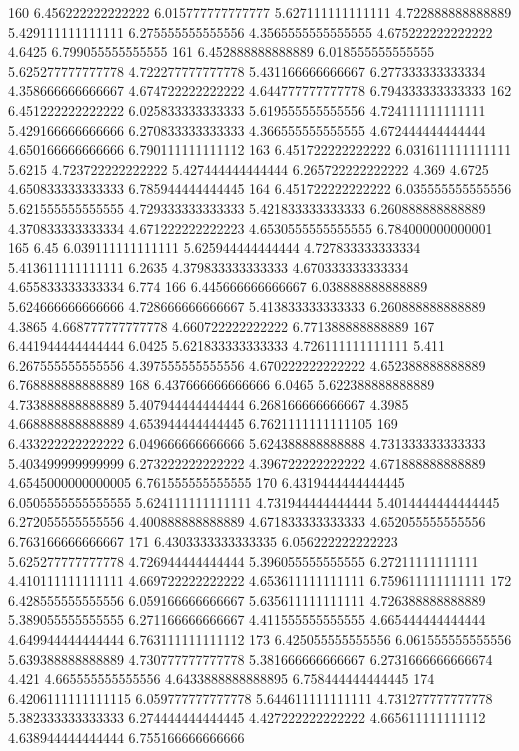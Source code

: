160 6.456222222222222 6.015777777777777 5.627111111111111 4.722888888888889 5.429111111111111 6.275555555555556 4.3565555555555555 4.675222222222222 4.6425 6.799055555555555
161 6.452888888888889 6.018555555555555 5.625277777777778 4.722277777777778 5.431166666666667 6.277333333333334 4.358666666666667 4.674722222222222 4.644777777777778 6.794333333333333
162 6.451222222222222 6.025833333333333 5.619555555555556 4.724111111111111 5.429166666666666 6.270833333333333 4.366555555555555 4.672444444444444 4.650166666666666 6.790111111111112
163 6.451722222222222 6.031611111111111 5.6215 4.723722222222222 5.427444444444444 6.265722222222222 4.369 4.6725 4.650833333333333 6.785944444444445
164 6.451722222222222 6.035555555555556 5.621555555555555 4.729333333333333 5.421833333333333 6.260888888888889 4.370833333333334 4.671222222222223 4.6530555555555555 6.784000000000001
165 6.45 6.039111111111111 5.625944444444444 4.727833333333334 5.413611111111111 6.2635 4.379833333333333 4.670333333333334 4.655833333333334 6.774
166 6.445666666666667 6.038888888888889 5.624666666666666 4.728666666666667 5.413833333333333 6.260888888888889 4.3865 4.668777777777778 4.660722222222222 6.771388888888889
167 6.441944444444444 6.0425 5.621833333333333 4.726111111111111 5.411 6.267555555555556 4.397555555555556 4.670222222222222 4.652388888888889 6.768888888888889
168 6.437666666666666 6.0465 5.622388888888889 4.733888888888889 5.407944444444444 6.268166666666667 4.3985 4.668888888888889 4.653944444444445 6.7621111111111105
169 6.433222222222222 6.049666666666666 5.624388888888888 4.731333333333333 5.403499999999999 6.273222222222222 4.396722222222222 4.671888888888889 4.6545000000000005 6.761555555555555
170 6.4319444444444445 6.0505555555555555 5.624111111111111 4.731944444444444 5.4014444444444445 6.272055555555556 4.400888888888889 4.671833333333333 4.652055555555556 6.763166666666667
171 6.4303333333333335 6.056222222222223 5.625277777777778 4.726944444444444 5.396055555555555 6.27211111111111 4.410111111111111 4.669722222222222 4.653611111111111 6.759611111111111
172 6.428555555555556 6.059166666666667 5.635611111111111 4.726388888888889 5.389055555555555 6.271166666666667 4.411555555555555 4.665444444444444 4.649944444444444 6.763111111111112
173 6.425055555555556 6.061555555555556 5.639388888888889 4.730777777777778 5.381666666666667 6.2731666666666674 4.421 4.665555555555556 4.6433888888888895 6.758444444444445
174 6.4206111111111115 6.059777777777778 5.644611111111111 4.731277777777778 5.382333333333333 6.274444444444445 4.427222222222222 4.665611111111112 4.638944444444444 6.755166666666666
